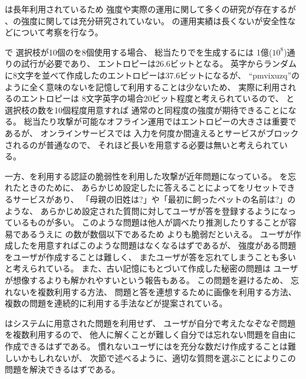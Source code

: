 \documentclass[twoside]{wiss}
\begin{document}


{\PW}は長年利用されているため
強度や実際の運用に関して多くの研究が存在するが%
\cite{Hayashi:2011:DSP:1978942.1979326}%
\cite{Komanduri:2011:PPM:1978942.1979321}%
、{\SQ}の強度に関しては充分研究されていない。
{\EP}の運用実績は長くないが安全性などについて考察を行なう。

{\EP}で
選択枝が10個の{\SQ}を8個使用する場合、
総当たりで{\PW}を生成するには
1億($10^8$)通りの試行が必要であり、
エントロピーは26.6ビットとなる。
英字からランダムに8文字を並べて作成した{\PW}のエントロピーは37.6ビットになるが、
``\textsf{pmvixuzq}''のように全く意味のない{\PW}を記憶して利用することは少ないため、
実際に利用される{\PW}のエントロピーは
8文字英字の場合20ビット程度と考えられているので\cite{NIST}、
{\SQ}と選択枝の数を10個程度用意すれば
通常の{\PW}と同程度の強度が期待できることになる。
%
総当たり攻撃が可能なオフライン運用ではエントロピーの大きさは重要であるが、
オンラインサービスでは
{\PW}入力を何度か間違えるとサービスがブロックされるのが普通なので、
それほど長い{\PW}を用意する必要は無いと考えられている\cite{Florencio:2007:SWP:1361419.1361429}。

一方、{\SQ}を利用する認証の脆弱性を利用した攻撃が近年問題になっている。
{\PW}を忘れたときのために、
あらかじめ設定した{\SQ}に答えることによって{\PW}をリセットできるサービスがあり、
「母親の旧姓は?」や「最初に飼ったペットの名前は?」のような、
あらかじめ設定された質問に対してユーザが答を登録するようになっているものが多い。
このような問題は他人が調べたり推測したりすることが容易であるうえに
{\SQ}の数が数個以下であるため
{\PW}よりも脆弱だといえる\cite{Rabkin:2008:PKQ:1408664.1408667}。%
%
ユーザが作成した{\SQ}を用意すればこのような問題はなくなるはずであるが、
強度がある問題をユーザが作成することは難しく、
またユーザが答を忘れてしまうことも多いと考えられている\cite{Just:2009:PCC:1572532.1572543}\cite{Schechter:2009:NSM:1607723.1608145}。
%
また、古い記憶にもとづいて作成した秘密の問題は
ユーザが想像するよりも解かれやすいという報告もある\cite{Renaud:2010:PQE:2146303.2146318}。
この問題を避けるため、
忘れない{\SQ}を複数利用する方法、
問題と答を連想するために画像を利用する方法、
複数の問題を連続的に利用する手法などが提案されている。

{\EP}はシステムに用意された問題を利用せず、
ユーザが自分で考えたなぞなぞ問題を複数利用するので、
他人に解くことが難しく自分では忘れない問題を自由に作成できるはずである。
慣れないユーザには{\SQ}を充分な数だけ作成することは難しいかもしれないが、
次節で述べるように、適切な質問を選ぶことによりこの問題を解決できるはずである。
\end{document}
